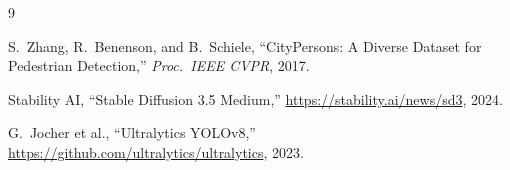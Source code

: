 \documentclass[12pt,a4paper]{article}
\begin{document}
\begin{thebibliography}{9}

S.~Zhang, R.~Benenson, and B.~Schiele,
``CityPersons: A Diverse Dataset for Pedestrian Detection,''
\textit{Proc.\ IEEE CVPR}, 2017.

Stability AI, ``Stable Diffusion 3.5 Medium,''
\url{https://stability.ai/news/sd3}, 2024.

G.~Jocher et al., ``Ultralytics YOLOv8,''
\url{https://github.com/ultralytics/ultralytics}, 2023.

\end{thebibliography}
\end{document}
